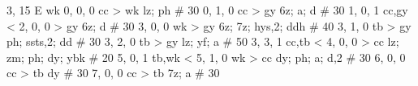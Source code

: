 %
3, 15 %
E %
wk
%
0, 0, 0
cc > wk
lz; ph # 30
%
0, 1, 0
cc > gy
6z; a; d # 30
%
1, 0, 1
cc,gy < 
%
2, 0, 0
 > gy
6z; d # 30
%
3, 0, 0
wk > gy
6z; 7z; hys,2; ddh # 40
%
3, 1, 0
tb > gy
ph; ssts,2; dd # 30
%
3, 2, 0
tb > gy
lz; yf; a # 50
%
3, 3, 1
cc,tb < 
%
4, 0, 0
 > cc
lz; zm; ph; dy; ybk # 20
%
5, 0, 1
tb,wk < 
%
5, 1, 0
wk > cc
dy; ph; a; d,2 # 30
%
6, 0, 0
cc > tb
dy # 30
%
7, 0, 0
cc > tb
7z; a # 30